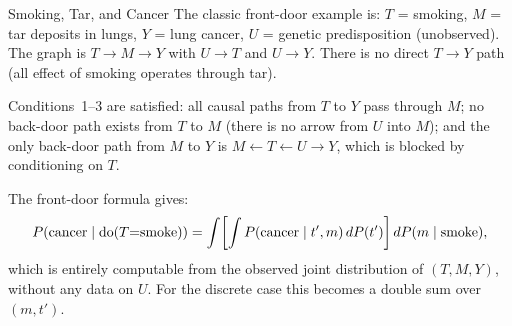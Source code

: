 \documentclass[master.tex]{subfiles}
\begin{document}
\begin{example}{Smoking, Tar, and Cancer}
\label{w3:ex:smoking}
The classic front-door example \citep{pearl1995causal} is:
$T$ = smoking, $M$ = tar deposits in lungs, $Y$ = lung cancer,
$U$ = genetic predisposition (unobserved).
The graph is $T \to M \to Y$ with $U \to T$ and $U \to Y$.
There is no direct $T\to Y$ path (all effect of smoking operates through
tar).

Conditions~1--3 are satisfied: all causal paths from $T$ to $Y$ pass
through $M$; no back-door path exists from $T$ to $M$ (there is no arrow
from $U$ into $M$); and the only back-door path from $M$ to $Y$ is
$M \leftarrow T \leftarrow U \to Y$, which is blocked by conditioning on $T$.

The front-door formula gives:
\[
  P(\text{cancer} \mid \mathrm{do}(T{=}\text{smoke}))
  = \int\!\left[\int P(\text{cancer} \mid t', m)\,dP(t')\right]
    dP(m \mid \text{smoke}),
\]
which is entirely computable from the observed joint distribution of
$(T, M, Y)$, without any data on $U$.  For the discrete case this becomes
a double sum over $(m, t')$.
\end{example}
\end{document}
